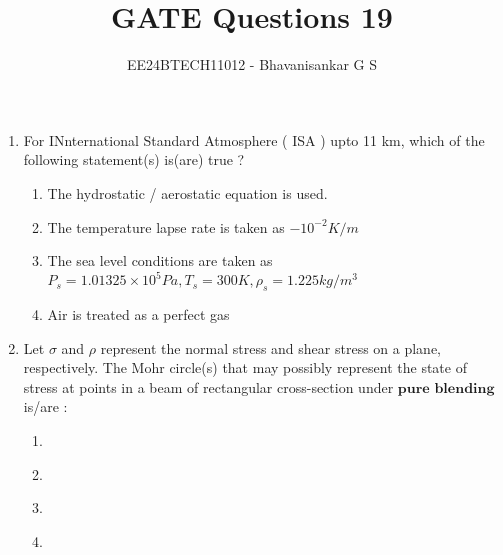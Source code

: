 \documentclass[journal]{IEEEtran}
\begin{document}

\vspace{3cm}

\title{GATE Questions 19}
\author{EE24BTECH11012 - Bhavanisankar G S}
{\let\newpage\relax\maketitle}
\begin{enumerate}
	\item For INnternational Standard Atmosphere ( ISA ) upto 11 km, which of the following statement(s) is(are) true ?
		\begin{enumerate}
			\item The hydrostatic / aerostatic equation is used.
			\item The temperature lapse rate is taken as $-10^{-2} K/m$
			\item The sea level conditions are taken as $P_s = 1.01325 \times 10^5 Pa, T_s = 300 K, \rho_s = 1.225 kg/m^3$
			\item Air is treated as a perfect gas
		\end{enumerate}
	\item Let $\sigma$ and $\rho$ represent the normal stress and shear stress on a plane, respectively. The Mohr circle(s) that may possibly represent the state of stress at points in a beam of rectangular cross-section under $\textbf{pure blending}$ is/are :
				\begin{multicols}{2}
					\begin{enumerate}
				\item
					\begin{figure}[H]
						\centering
						
					\end{figure}
				\item
					\begin{figure}[H]
						\centering
						
					\end{figure}
				\item
					\begin{figure}[H]
						\centering
						
					\end{figure}
				\item
					\begin{figure}[H]
						\centering
						
					\end{figure}

\end{enumerate}
\end{multicols}
\end{enumerate}
\end{document}
